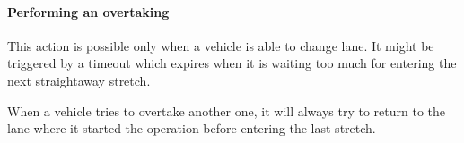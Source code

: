 \paragraph{Performing an overtaking} This action is possible only when a
vehicle is able to change lane. It might be triggered by a timeout which
expires when it is waiting too much for entering the next straightaway stretch.

When a vehicle tries to overtake another one, it will always try to return to
the lane where it started the operation before entering the last stretch.



